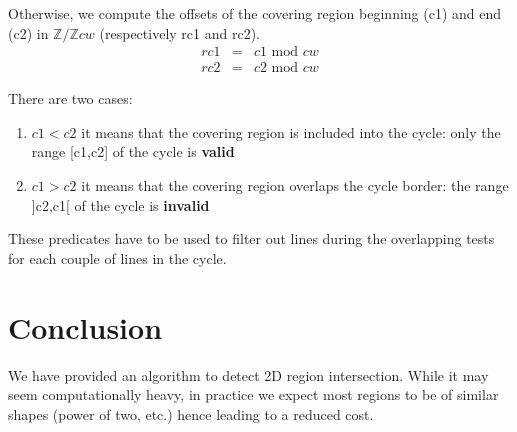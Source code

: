 \documentclass[twocolumn]{article}
\begin{document}
Otherwise, we compute the offsets of the covering region beginning (c1) and end
(c2) in $\mathbb{Z}/\mathbb{Z}cw$ (respectively rc1 and rc2).
\[
\begin{array}{rcl}
rc1 &=& c1 \textrm{ mod } cw \\
rc2 &=& c2 \textrm{ mod } cw
\end{array}
\]

There are two cases:
\begin{enumerate}
   \item $c1 < c2$ it means that the covering region is included into the cycle:
   only the range [c1,c2] of the cycle is \textbf{valid}
   \item $c1 > c2$ it means that the covering region overlaps the cycle border:
   the range ]c2,c1[ of the cycle is \textbf{invalid}
\end{enumerate}

These predicates have to be used to filter out lines during the overlapping
tests for each couple of lines in the cycle.


\section{Conclusion}

We have provided an algorithm to detect 2D region intersection. While it may
seem computationally heavy, in practice we expect most regions to be of similar
shapes (power of two, etc.) hence leading to a reduced cost.
\end{document}
